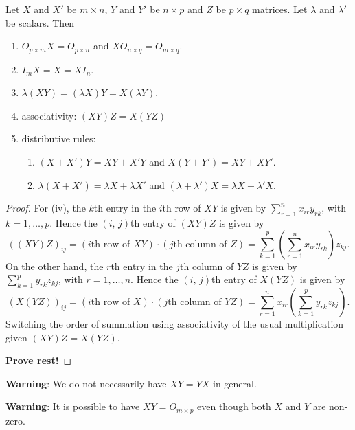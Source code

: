 \documentclass[10pt, a4paper]{article}
\begin{document}
\begin{proposition}
    Let $X$ and $X'$ be $m \times n$, $Y$ and $Y'$ be $n \times p$ and $Z$ be $p \times q$ matrices. Let $\lambda$ and $\lambda'$ be scalars. Then
    \begin{enumerate}[label = (\roman*)]
        \item $O_{p \times m}X = O_{p \times n}$ and $XO_{n \times q} = O_{m \times q}$.
        \item $I_{m}X = X = XI_n$.
        \item $\lambda(XY) = (\lambda X)Y = X(\lambda Y)$.
        \item associativity: $(XY)Z = X(YZ)$
        \item distributive rules:
        \begin{enumerate}[label = (\alph*)]
            \item $(X + X')Y = XY + X'Y$ and $X(Y + Y') = XY + XY'$.
            \item $\lambda(X + X') = \lambda X + \lambda X'$ and $(\lambda + \lambda')X = \lambda X + \lambda' X$.
        \end{enumerate}
    \end{enumerate}
    \begin{proof}
        For (iv), the $k$th entry in the $i$th row of $XY$ is given by $\sum_{r = 1}^{n}x_{ir}y_{rk}$, with $k = 1,\dotsc, p$. Hence the $(i,\,j)$th entry of $(XY)Z$ is given by
        \[
        ((XY)Z)_{ij} = (i\text{th row of }XY) \cdot (j\text{th column of } Z) = \sum_{k = 1}^{p}\left(\sum_{r = 1}^{n}x_{ir}y_{rk}\right)z_{kj}.
        \]
        On the other hand, the $r$th entry in the $j$th column of $YZ$ is given by $\sum_{k = 1}^{p}y_{rk}z_{kj}$, with $r = 1, \dotsc, n$. Hence the $(i,\,j)$th entry of $X(YZ)$ is given by
        \[
        (X(YZ))_{ij} = (i\text{th row of } X) \cdot (j\text{th column of } YZ) = \sum_{r = 1}^{n}x_{ir}\left(\sum_{k = 1}^{p}y_{rk}z_{kj}\right).
        \]
        Switching the order of summation using associativity of the usual multiplication given $(XY)Z = X(YZ)$.
        
        \textbf{Prove rest!}
    \end{proof}
\end{proposition}

\textbf{Warning}: We do not necessarily have $XY = YX$ in general.

\textbf{Warning}: It is possible to have $XY = O_{m \times p}$ even though both $X$ and $Y$ are non-zero.
\end{document}
